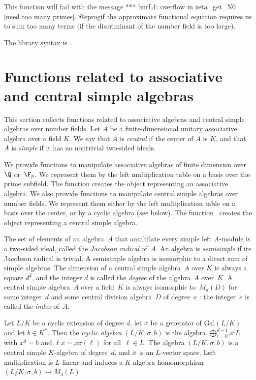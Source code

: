 This function will fail with the message
\bprog
 *** bnrL1: overflow in zeta_get_N0 [need too many primes].
@eprog\noindent if the approximate functional equation requires us to sum
too many terms (if the discriminant of the number field is too large).

The library syntax is .

\section{Functions related to associative and central simple algebras}

This section collects functions related to associative algebras and central
simple algebras over number fields. Let $A$ be a finite-dimensional unitary
associative algebra over a field $K$. We say that $A$ is \emph{central} if
the center of $A$ is $K$, and that $A$ is \emph{simple} if it has no
nontrivial two-sided ideals.

\par We provide functions to manipulate associative algebras of finite
dimension over~$\Q$ or~$\F_p$. We represent them by the left multiplication
table on a basis over the prime subfield. The function 
creates the object representing an associative algebra. We also provide
functions to manipulate central simple algebras over number fields. We
represent them either by the left multiplication table on a basis over the
center, or by a cyclic algebra (see below). The function~ creates
the object representing a central simple algebra.

\par The set of elements of an algebra~$A$ that annihilate every simple left
$A$-module is a two-sided ideal, called the \emph{Jacobson radical} of~$A$.
An algebra is \emph{semisimple} if its Jacobson radical is trivial. A
semisimple algebra is isomorphic to a direct sum of simple algebras. The
dimension of a central simple algebra~$A$ over $K$ is always a square $d^2$,
and the integer $d$ is called the \emph{degree} of the algebra~$A$ over~$K$.
A central simple algebra~$A$ over a field~$K$ is always isomorphic to~$M_d(D)$
for some integer~$d$ and some central division algebra~$D$ of degree~$e$ : the
integer~$e$ is called the \emph{index} of~$A$.

\par Let $L/K$ be a cyclic extension of degree $d$, let $\sigma$ be a
generator of $\text{Gal}(L/K)$ and let $b\in K^*$. Then the \emph{cyclic
algebra} $(L/K,\sigma,b)$ is the algebra $\bigoplus_{i=0}^{d-1}x^iL$ with
$x^d=b$ and $\ell x=x\sigma(\ell)$ for all~$\ell\in L$. The algebra
$(L/K,\sigma,b)$ is a central simple $K$-algebra of degree~$d$, and it is an
$L$-vector space. Left multiplication is $L$-linear and induces a $K$-algebra
homomorphism $(L/K,\sigma,b)\to M_d(L)$.

